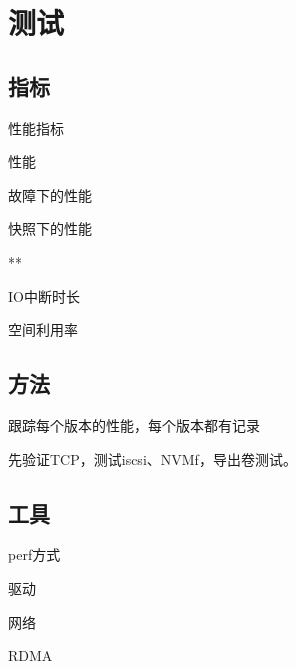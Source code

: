 \chapter{测试}

\section{指标}

性能指标
\begin{enumbox}
\item 性能
\item 故障下的性能
\item 快照下的性能
\item ***
\item IO中断时长
\item 空间利用率
\end{enumbox}

\section{方法}

跟踪每个版本的性能，每个版本都有记录

先验证TCP，测试iscsi、NVMf，导出卷测试。

\section{工具}

perf方式

驱动

网络

RDMA
